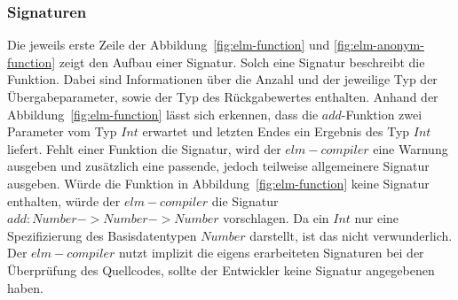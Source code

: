 \subsubsection{Signaturen}
\label{sec:Signaturen}
Die jeweils erste Zeile der Abbildung~\ref{fig:elm-function} und \ref{fig:elm-anonym-function} zeigt den Aufbau einer Signatur. Solch eine Signatur beschreibt die Funktion. Dabei sind Informationen über die Anzahl und der jeweilige Typ der Übergabeparameter, sowie der Typ des Rückgabewertes enthalten. Anhand der Abbildung~\ref{fig:elm-function} lässt sich erkennen, dass die $add$-Funktion zwei Parameter vom Typ $Int$ erwartet und letzten Endes ein Ergebnis des Typ $Int$ liefert. Fehlt einer Funktion die Signatur, wird der $elm-compiler$ eine Warnung ausgeben und zusätzlich eine passende, jedoch teilweise allgemeinere Signatur ausgeben. Würde die Funktion in Abbildung~\ref{fig:elm-function} keine Signatur enthalten, würde der $elm-compiler$ die Signatur $add : Number -> Number -> Number$ vorschlagen. Da ein $Int$ nur eine Spezifizierung des Basisdatentypen $Number$ darstellt, ist das nicht verwunderlich. Der $elm-compiler$ nutzt implizit die eigens erarbeiteten Signaturen bei der Überprüfung des Quellcodes, sollte der Entwickler keine Signatur angegebenen haben.

